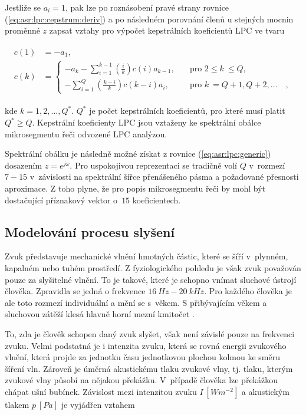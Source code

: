 \noindent Jestliže se $a_i = 1$, pak lze po roznásobení pravé strany rovnice (\ref{eq:asr:lpc:cepstrum:deriv}) a po následném porovnání členů u stejných mocnin proměnné $z$ zapsat vztahy pro výpočet kepstrálních koeficientů LPC ve tvaru

\begin{align}
  \begin{split}
    c(1) &= -a_1, \\
    c(k) &=
    \begin{cases}
      - a_k - \sum_{i=1}^{k-1} \left(\frac{i}{k}\right) c(i) a_{k-1},  & \quad \text{pro } 2 \leq  k~\leq Q, \\
      - \sum_{i=1}^{Q} \left(\frac{k - i}{k}\right) c(k-i) a_i,  & \quad \text{pro }  k~= Q + 1, Q + 2, \dots \quad ,
    \end{cases}
  \end{split}
  \label{eq:asr:lpc:cepstrum:coef}
\end{align}

\noindent kde $k = 1, 2, \dots , Q^{*}$. $Q^{*}$ je počet kepstrálních koeficientů, pro které musí platit $Q^{*} \geq Q$. Kepstrální koeficienty LPC jsou vztaženy ke spektrální obálce mikrosegmentu řeči odvozené LPC analýzou.

Spektrální obálku je následně možné získat z rovnice (\ref{eq:asr:lpc:generic}) dosazením $z = e^{j\omega}$. Pro uspokojivou reprezentaci se tradičně volí $Q$ v~rozmezí $7-15$ v~závislosti na spektrální šířce přenášeného pásma a požadované přesnosti aproximace. Z toho plyne, že pro popis mikrosegmentu řeči by mohl být dostačující příznakový vektor o~$15$ koeficientech.

\subsection{Modelování procesu slyšení}
\label{chap:asr:parametrization:hearing}

Zvuk představuje mechanické vlnění hmotných částic, které se šíří v~plynném, kapalném nebo tuhém prostředí. Z fyziologického pohledu je však zvuk považován pouze za slyšitelné vlnění. To je takové, které je schopno vnímat sluchové ústrojí člověka. Zpravidla se jedná o frekvence $16\ Hz - 20\ kHz$. Pro každého člověka je ale toto rozmezí individuální a mění se s~věkem. S přibývajícím věkem a sluchovou zátěží klesá hlavně horní mezní kmitočet \cite{Psutka2006}.

To, zda je člověk schopen daný zvuk slyšet, však není závislé pouze na frekvenci zvuku. Velmi podstatná je i intenzita zvuku, která se rovná energii zvukového vlnění, která projde za jednotku času jednotkovou plochou kolmou ke směru šíření vln. Zároveň je úměrná akustickému tlaku zvukové vlny, tj. tlaku, kterým zvukové vlny působí na nějakou překážku. V~případě člověka lze překážkou chápat ušní bubínek. Závislost mezi intenzitou zvuku $I\ \left[Wm^{-2}\right]$ a akustickým tlakem $p\ \left[Pa\right]$ je vyjádřen vztahem

